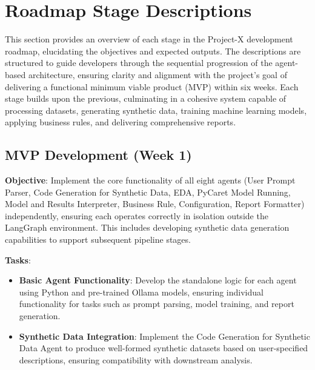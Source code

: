 \documentclass{article}
\begin{document}
\section{Roadmap Stage Descriptions}
This section provides an overview of each stage in the Project-X development roadmap, elucidating the objectives and expected outputs. The descriptions are structured to guide developers through the sequential progression of the agent-based architecture, ensuring clarity and alignment with the project’s goal of delivering a functional minimum viable product (MVP) within six weeks. Each stage builds upon the previous, culminating in a cohesive system capable of processing datasets, generating synthetic data, training machine learning models, applying business rules, and delivering comprehensive reports.

\subsection{MVP Development (Week 1)}
\textbf{Objective}: Implement the core functionality of all eight agents (User Prompt Parser, Code Generation for Synthetic Data, EDA, PyCaret Model Running, Model and Results Interpreter, Business Rule, Configuration, Report Formatter) independently, ensuring each operates correctly in isolation outside the LangGraph environment. This includes developing synthetic data generation capabilities to support subsequent pipeline stages.

\textbf{Tasks}:
\begin{itemize}[label=--]
    \item \textbf{Basic Agent Functionality}: Develop the standalone logic for each agent using Python and pre-trained Ollama models, ensuring individual functionality for tasks such as prompt parsing, model training, and report generation.
    \item \textbf{Synthetic Data Integration}: Implement the Code Generation for Synthetic Data Agent to produce well-formed synthetic datasets based on user-specified descriptions, ensuring compatibility with downstream analysis.
\end{itemize}
\end{document}
